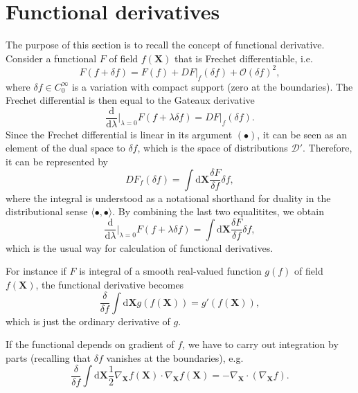 \documentclass[
10pt, %
a4paper, %
oneside, %
headinclude,footinclude, %
BCOR5mm, %
]{scrartcl}
\newcommand{\XX}{\mathbf{X}}
\newcommand{\diff}{\mathrm{d}}
\newcommand{\dX}{\mathrm{d}\XX}
\newcommand{\OBig}{\mathcal{O}}
\begin{document}




\appendix
\section{Functional derivatives}\label{sec.FD}
The purpose of this section is to recall the concept of functional derivative. Consider a functional $F$ of field $f(\XX)$ that is Frechet differentiable, i.e. 
\begin{equation}
	F(f+\delta f) = F(f) +  DF|_f (\delta f) + \OBig(\delta f)^2,
\end{equation}
where $\delta f \in C^\infty_0$ is a variation with compact support (zero at the boundaries).
The Frechet differential is then equal to the Gateaux derivative
\begin{equation}
	\frac{\diff}{\diff \lambda}\Big|_{\lambda = 0} F(f+\lambda \delta f) = DF|_f (\delta f).
\end{equation}
Since the Frechet differential is linear in its argument $(\bullet)$, it can be seen as an element of the dual space to $\delta f$, which is the space of distributions $\mathcal{D}'$. Therefore, it can be represented by 
\begin{equation}
	DF_f(\delta f) = \int\dX \frac{\delta F}{\delta f} \delta f,
\end{equation}
where the integral is understood as a notational shorthand for duality in the distributional sense $\langle\bullet,\bullet\rangle$. By combining the last two equalitites, we obtain
\begin{equation}
	\frac{\diff}{\diff \lambda}\Big|_{\lambda = 0} F(f+\lambda \delta f) 
	=  \int\dX \frac{\delta F}{\delta f} \delta f,
\end{equation}
which is the usual way for calculation of functional derivatives.

For instance if $F$ is integral of a smooth real-valued function $g(f)$ of field $f(\XX)$, the functional derivative becomes
\begin{equation}
	\frac{\delta}{\delta f}\int \dX g(f(\XX)) = g'(f(\XX)),
\end{equation}
which is just the ordinary derivative of $g$. 

If the functional depends on gradient of $f$, we have to carry out integration by parts (recalling that $\delta f$ vanishes at the boundaries), e.g.
\begin{equation}
	\frac{\delta}{\delta f}\int \dX \frac{1}{2}\nabla_\XX f(\XX) \cdot \nabla_\XX f(\XX) = -\nabla_\XX \cdot (\nabla_\XX f).
\end{equation}
\end{document}
